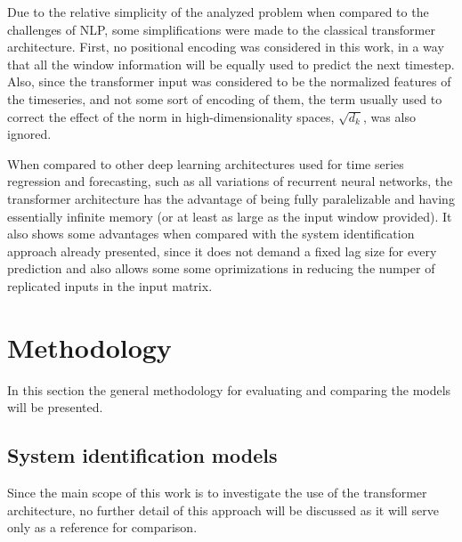 \documentclass[conference]{IEEEtran}
\begin{document}
Due to the relative simplicity of the analyzed problem when compared to the challenges of NLP, some simplifications were made to the
classical transformer architecture. First, no positional encoding was considered in this work, in a way that all the window information
will be equally used to predict the next timestep. Also, since the transformer input was considered to be the normalized features of the timeseries,
and not some sort of encoding of them, the term usually used to correct the effect of the norm in high-dimensionality spaces, $\sqrt{d_k}$,
was also ignored.

When compared to other deep learning architectures used for time series regression and forecasting, such as all variations of
recurrent neural networks, the transformer architecture has the advantage of being fully paralelizable and having essentially
infinite memory (or at least as large as the input window provided). It also shows some advantages when compared with the system
identification approach already presented, since it does not demand a fixed lag size for every prediction and also allows some
some oprimizations in reducing the numper of replicated inputs in the input matrix.

\section{Methodology}\label{sec:section_method}

In this section the general methodology for evaluating and comparing the models will be presented.

\subsection{System identification models}

Since the main scope of this work is to investigate the use of the transformer architecture, no further detail of this approach will be
discussed as it will serve only as a reference for comparison.

\end{document}
